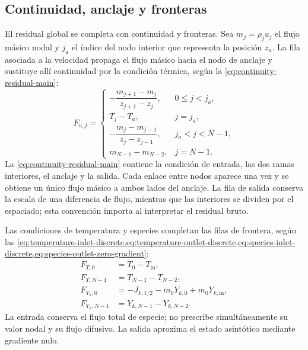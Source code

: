 \documentclass[12pt,a4paper,twoside,openany]{book}
\newcommand{\Tin}{T_{\mathrm{in}}}
\begin{document}
\subsection{Continuidad, anclaje y fronteras}

El residual global se completa con continuidad y fronteras.
Sea \(m_j=\rho_j u_j\) el flujo másico nodal y \(j_a\) el índice del nodo
interior que representa la posición \(z_a\). La fila asociada a la velocidad propaga el flujo másico hacia
el nodo de anclaje y sustituye allí continuidad por la condición térmica, según la \cref{eq:continuity-residual-main}:
\begin{equation}
  F_{u,j}=\begin{cases}
  -\dfrac{m_{j+1}-m_j}{z_{j+1}-z_j}, & 0\le j<j_a,\\[1.5ex]
  T_j-T_a, & j=j_a,\\[1.0ex]
  -\dfrac{m_j-m_{j-1}}{z_j-z_{j-1}}, & j_a<j<N-1,\\[1.5ex]
  m_{N-1}-m_{N-2}, & j=N-1.
  \end{cases}
  \label{eq:continuity-residual-main}
\end{equation}
La \cref{eq:continuity-residual-main} contiene la condición de entrada, las dos
ramas interiores, el anclaje y la salida. Cada enlace entre nodos aparece una vez y
se obtiene un único flujo másico a ambos lados del anclaje. La fila de salida
conserva la escala de una diferencia de flujo, mientras que las interiores se
dividen por el espaciado; esta convención importa al interpretar el residual bruto.

Las condiciones de temperatura y especies completan las filas de frontera,
según las \cref{eq:temperature-inlet-discrete,eq:temperature-outlet-discrete,eq:species-inlet-discrete,eq:species-outlet-zero-gradient}:
\begin{align}
 F_{T,0}&=T_0-\Tin,
 \label{eq:temperature-inlet-discrete}\\
 F_{T,N-1}&=T_{N-1}-T_{N-2},
 \label{eq:temperature-outlet-discrete}\\
 F_{Y_k,0}&=-J_{k,1/2}-m_0Y_{k,0}+m_0Y_{k,\mathrm{in}},
 \label{eq:species-inlet-discrete}\\
 F_{Y_k,N-1}&=Y_{k,N-1}-Y_{k,N-2}.
 \label{eq:species-outlet-zero-gradient}
\end{align}
La entrada conserva el flujo total de especie; no prescribe simultáneamente
su valor nodal y su flujo difusivo. La salida aproxima el estado asintótico
mediante gradiente nulo.
\end{document}
